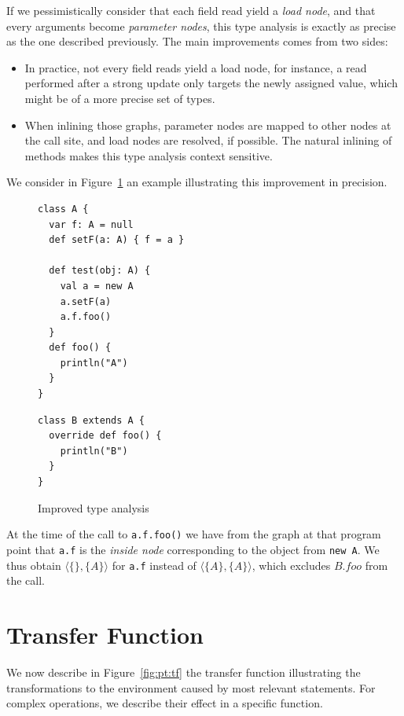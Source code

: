 If we pessimistically consider that each field read yield a \emph{load node},
and that every arguments become \emph{parameter nodes}, this type analysis is
exactly as precise as the one described previously. The main improvements comes
from two sides:
\begin{itemize}
    \item In practice, not every field reads yield a load node, for instance, a
read performed after a strong update only targets the newly assigned value,
which might be of a more precise set of types.
    \item When inlining those graphs, parameter nodes are mapped to other nodes
at the call site, and load nodes are resolved, if possible. The natural
inlining of methods makes this type analysis context sensitive. 
\end{itemize}
We consider in Figure~\ref{fig:pt:precise} an example illustrating this
improvement in precision.

\begin{figure}[h]
    \centering
\begin{minipage}[tl]{0.5\linewidth}
    \centering
\lstset{linewidth=0.8\linewidth}
\begin{lstlisting}
class A {
  var f: A = null
  def setF(a: A) { f = a }

  def test(obj: A) {
    val a = new A
    a.setF(a)
    a.f.foo()
  }
  def foo() {
    println("A")
  }
}
\end{lstlisting}
\end{minipage}
\begin{minipage}[tl]{0.5\linewidth}
    \centering
\lstset{linewidth=0.8\linewidth}
\begin{lstlisting}
class B extends A {
  override def foo() {
    println("B")
  }
}
\end{lstlisting}
\end{minipage}
    \caption{Improved type analysis}
    \label{fig:pt:precise}
\end{figure}

At the time of the call to \verb/a.f.foo()/ we have from the graph at that
program point that \verb/a.f/ is the \emph{inside node} corresponding to the
object from \verb/new A/. We thus obtain $\langle \{\}, \{A\} \rangle$ for \verb/a.f/ instead of
$\langle \{A\}, \{A\} \rangle$, which excludes $B.foo$ from the call.
\section{Transfer Function}
We now describe  in Figure~\ref{fig:pt:tf} the transfer function illustrating
the transformations to the environment caused by most relevant statements. For
complex operations, we describe their effect in a specific function.

